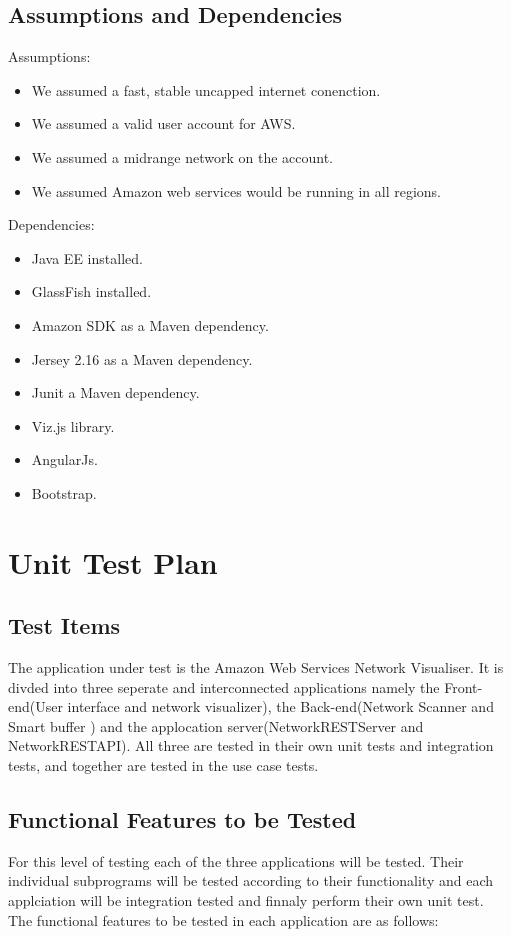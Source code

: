 \documentclass[hidelinks,a4paper,12pt]{article}
\begin{document}
\subsection{Assumptions and Dependencies}
Assumptions:
\begin{itemize}
  \item We assumed a fast, stable uncapped internet conenction.
  \item We assumed a valid user account for AWS.
\item We assumed a midrange network on the account.
\item We assumed Amazon web services would be running in all regions.
\end{itemize}
Dependencies:
\begin{itemize}
  \item Java EE installed.
  \item GlassFish installed.
\item Amazon SDK as a Maven dependency.
\item Jersey 2.16 as a Maven dependency.
\item Junit a Maven dependency.
\item Viz.js library.
\item AngularJs.
\item Bootstrap.
\end{itemize}

\section{Unit Test Plan}

\subsection{Test Items}
The application under test is the Amazon Web Services Network Visualiser. It is divded into three seperate and interconnected applications namely the Front-end(User interface and network visualizer), the Back-end(Network Scanner and Smart buffer ) and the applocation server(NetworkRESTServer and NetworkRESTAPI). All three are tested in their own unit tests and integration tests, and together are tested in the use case tests.
 
\subsection{Functional Features to be Tested}  
For this level of testing each of the three applications will be tested. Their individual subprograms will be tested according to their functionality and each applciation will be integration tested and finnaly perform their own unit test. The functional features to be tested in each application are as follows:
\end{document}
